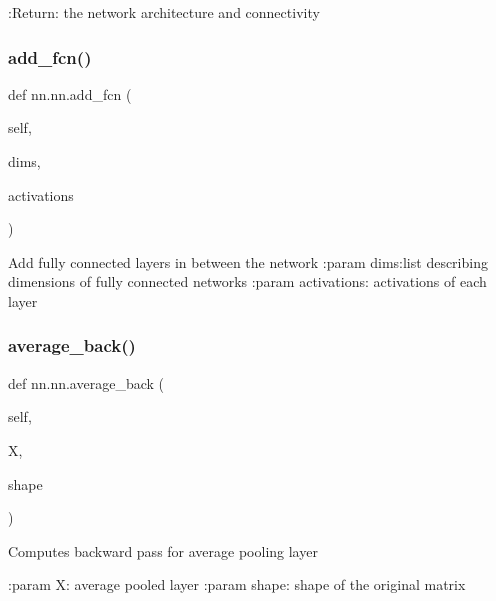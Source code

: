\begin{DoxyVerb}:Return: the network architecture and connectivity
\end{DoxyVerb}
 \mbox{\label{classnn_1_1nn_a6d616cb56588767f5ce1c20d6b7c6bc0}} 
\subsubsection{\texorpdfstring{add\+\_\+fcn()}{add\_fcn()}}
{\footnotesize\ttfamily def nn.\+nn.\+add\+\_\+fcn (\begin{DoxyParamCaption}\item[{}]{self,  }\item[{}]{dims,  }\item[{}]{activations }\end{DoxyParamCaption})}

\begin{DoxyVerb}Add fully connected layers in between the network
:param dims:list describing dimensions of fully connected networks
:param activations: activations of each layer
\end{DoxyVerb}
 \mbox{\label{classnn_1_1nn_aff147cb8f5d4919dd728fb0cbb6b0bbd}} 
\subsubsection{\texorpdfstring{average\+\_\+back()}{average\_back()}}
{\footnotesize\ttfamily def nn.\+nn.\+average\+\_\+back (\begin{DoxyParamCaption}\item[{}]{self,  }\item[{}]{X,  }\item[{}]{shape }\end{DoxyParamCaption})}

\begin{DoxyVerb}Computes backward pass for average pooling layer

:param X: average pooled layer
:param shape: shape of the original matrix
\end{DoxyVerb}
 \mbox{\label{classnn_1_1nn_a53a7beb698fe127ebb1f636fccbaa126}} 
